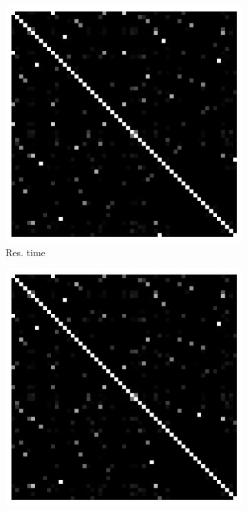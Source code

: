 \begin{figure}[t]
        \begin{subfigure}{0.19\textwidth}
                \includegraphics[width=\linewidth]{Figures/cassandra-runtime-commitX.pdf}
                \caption{Res. time}
        \end{subfigure}%
        \begin{subfigure}{0.19\textwidth}
                \includegraphics[width=\linewidth]{Figures/cassandra-cpu-commitX.pdf}

\end{subfigure}
\end{figure}
